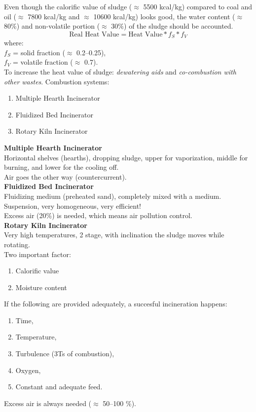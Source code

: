 \documentclass{article}
\numberwithin{equation}{section}
\begin{document}
Even though the calorific value of sludge ($\approx$ 5500 kcal/kg) compared to coal and oil ($\approx$ 7800 kcal/kg and $\approx$ 10600 kcal/kg) looks good, the water content ($\approx$ 80\%) and non-volatile portion ($\approx$ 30\%) of the sludge should be accounted.
\[
\text{Real Heat Value} = \text{Heat Value} * f_S * f_V
\]
where:\\
$f_S$ = solid fraction ($\approx$ 0.2--0.25),\\
$f_V$ = volatile fraction ($\approx$ 0.7).\\
To increase the heat value of sludge: \emph{dewatering aids} and \emph{co-combustion with other wastes}.
Combustion systems:
\begin{enumerate}
    \item Multiple Hearth Incinerator
    \item Fluidized Bed Incinerator
    \item Rotary Kiln Incinerator
\end{enumerate}
\textbf{Multiple Hearth Incinerator}\\
Horizontal shelves (hearths), dropping sludge, upper for vaporization, middle for burning, and lower for the cooling off.\\
Air goes the other way (countercurrent).\\
\textbf{Fluidized Bed Incinerator}\\
Fluidizing medium (preheated sand), completely mixed with a medium. Suspension, very homogeneous, very efficient!\\
Excess air (20\%) is needed, which means air pollution control.\\
\textbf{Rotary Kiln Incinerator}\\
Very high temperatures, 2 stage, with inclination the sludge moves while rotating.\\
Two important factor:
\begin{enumerate}
    \item Calorific value
    \item Moisture content
\end{enumerate}
If the following are provided adequately, a succesful incineration happens:
\begin{enumerate}
    \item Time,
    \item Temperature,
    \item Turbulence (3Ts of combustion),
    \item Oxygen,
    \item Constant and adequate feed.
\end{enumerate}
Excess air is always needed ($\approx$ 50--100 \%).
\end{document}
